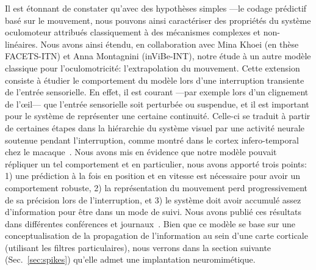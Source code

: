 Il est étonnant de constater qu'avec des hypothèses simples ---le codage prédictif basé sur le mouvement, nous pouvons ainsi caractériser des propriétés du système oculomoteur attribués classiquement à des mécanismes complexes et non-linéaires. Nous avons ainsi étendu, en collaboration avec Mina Khoei (en thèse FACETS-ITN) et Anna Montagnini (inViBe-INT), notre étude à un autre modèle classique pour l'oculomotricité: l'extrapolation du mouvement.
Cette extension consiste à étudier le comportement du modèle lors d'une interruption transiente de l'entrée sensorielle. En effet, il est courant ---par exemple lors d'un clignement de l'\oe il--- que l'entrée sensorielle soit perturbée ou suspendue, et il est important pour le système de représenter une certaine continuité. Celle-ci se traduit à partir de certaines étapes dans la hiérarchie du système visuel par une activité neurale soutenue pendant l'interruption, comme montré dans le cortex infero-temporal chez le macaque~\citep{Assad95}. Nous avons mis en évidence que notre modèle pouvait répliquer un tel comportement et en particulier, nous avons apporté trois points: 1) une prédiction à la fois en position et en vitesse est nécessaire pour avoir un comportement robuste, 2) la représentation du mouvement perd progressivement de sa précision lors de l'interruption, et 3) le système doit avoir accumulé assez d'information pour être dans un mode de suivi. Nous avons publié ces résultats dans différentes conférences et journaux~\citep{Khoei13jpp,KhoeiMassonPerrinet17}. Bien que ce modèle se base sur une conceptualisation de la propagation de l'information au sein d'une carte corticale (utilisant les filtres particulaires), nous verrons dans la section suivante (Sec.~\ref{sec:spikes}) qu'elle admet une implantation neuromimétique. %
